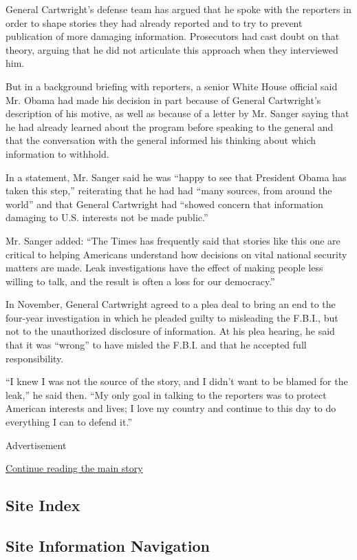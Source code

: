 General Cartwright's defense team has argued that he spoke with the
reporters in order to shape stories they had already reported and to try
to prevent publication of more damaging information. Prosecutors had
cast doubt on that theory, arguing that he did not articulate this
approach when they interviewed him.

But in a background briefing with reporters, a senior White House
official said Mr. Obama had made his decision in part because of General
Cartwright's description of his motive, as well as because of a letter
by Mr. Sanger saying that he had already learned about the program
before speaking to the general and that the conversation with the
general informed his thinking about which information to withhold.

In a statement, Mr. Sanger said he was ``happy to see that President
Obama has taken this step,'' reiterating that he had had ``many sources,
from around the world'' and that General Cartwright had ``showed concern
that information damaging to U.S. interests not be made public.''

Mr. Sanger added: ``The Times has frequently said that stories like this
one are critical to helping Americans understand how decisions on vital
national security matters are made. Leak investigations have the effect
of making people less willing to talk, and the result is often a loss
for our democracy.''

In November, General Cartwright agreed to a plea deal to bring an end to
the four-year investigation in which he pleaded guilty to misleading the
F.B.I., but not to the unauthorized disclosure of information. At his
plea hearing, he said that it was ``wrong'' to have misled the F.B.I.
and that he accepted full responsibility.

``I knew I was not the source of the story, and I didn't want to be
blamed for the leak,'' he said then. ``My only goal in talking to the
reporters was to protect American interests and lives; I love my country
and continue to this day to do everything I can to defend it.''

Advertisement

\protect\hyperlink{after-bottom}{Continue reading the main story}

\hypertarget{site-index}{%
\subsection{Site Index}\label{site-index}}

\hypertarget{site-information-navigation}{%
\subsection{Site Information
Navigation}\label{site-information-navigation}}

